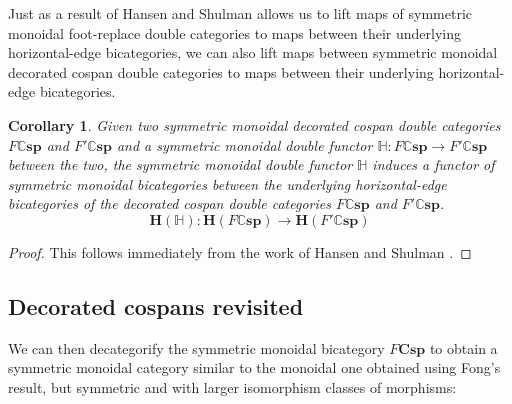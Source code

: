 \documentclass[oneside,final]{ucr}
\newtheorem{corollary}[theorem]{Corollary}
\theoremstyle{definition}
\begin{document}
{Just as a result of Hansen and Shulman \cite{Shul3} allows us to lift maps of symmetric monoidal foot-replace double categories to maps between their underlying horizontal-edge bicategories, we can also lift maps between symmetric monoidal decorated cospan double categories to maps between their underlying horizontal-edge bicategories.

\begin{corollary}
Given two symmetric monoidal decorated cospan double categories $F \mathbb{C}\mathbf{sp}$ and $F' \mathbb{C}\mathbf{sp}$ and a symmetric monoidal double functor $\mathbb{H} \colon F \mathbb{C}\mathbf{sp} \to F' \mathbb{C}\mathbf{sp}$ between the two, the symmetric monoidal double functor $\mathbb{H}$ induces a functor of symmetric monoidal bicategories between the underlying horizontal-edge bicategories of the decorated cospan double categories $F \mathbb{C}\mathbf{sp}$ and $F' \mathbb{C}\mathbf{sp}$. $$\mathbf{H}(\mathbb{H}) \colon \mathbf{H}(F\mathbb{C}\mathbf{sp}) \to \mathbf{H}(F'\mathbb{C}\mathbf{sp})$$
\end{corollary}

\begin{proof}
This follows immediately from the work of Hansen and Shulman \cite{Shul3}.
\end{proof}

\subsection{Decorated cospans revisited}
We can then decategorify the symmetric monoidal bicategory $F\mathbf{Csp}$ to obtain a symmetric monoidal category similar to the monoidal one obtained using Fong's result, but symmetric and with larger isomorphism classes of morphisms:

}
\end{document}
